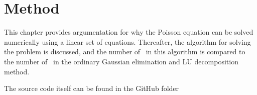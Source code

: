 \chapter{Method}
\label{chap:method}
This chapter provides argumentation for why the Poisson equation can be solved numerically using a linear set of equations. 
Thereafter, the algorithm for solving the problem is discussed, and the number of \flops \, in this algorithm is compared to the number of \flops \, in the ordinary Gaussian elimination and LU decomposition method.  

The source code itself can be found in the GitHub folder 